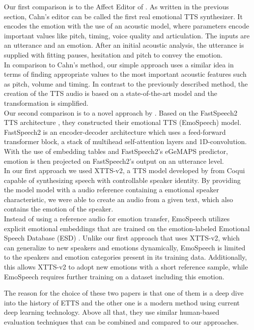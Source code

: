 \documentclass[11pt]{article}
\begin{document}
Our first comparison is to the Affect Editor of \cite{cahn_generation_2000}. As written in the previous section, Cahn's editor can be called the first real emotional TTS synthesizer. It encodes the emotion with the use of an acoustic model, where parameters encode important values like pitch, timing, voice quality and articulation. The inputs are an utterance and an emotion. After an initial acoustic analysis, the utterance is supplied with fitting pauses, hesitation and pitch to convey the emotion. \\
In comparison to Cahn's method, our simple approach uses a similar idea in terms of finding appropriate values to the most important acoustic features such as pitch, volume and timing. In contrast to the previously described method, the creation of the TTS audio is based on a state-of-the-art model and the transformation is simplified.\\
Our second comparison is to a novel approach by \cite{diatlova_emospeech_2023}. Based on the FastSpeech2 TTS architecture \cite{ren2020fastspeech}, they constructed their emotional TTS (EmoSpeech) model. FastSpeech2 is an encoder-decoder architecture which uses a feed-forward transformer block, a stack of multihead self-attention layers and 1D-convolution. With the use of embedding tables and FastSpeech2's eGeMAPS predictor, emotion is then projected on FastSpeech2's output on an utterance level. \\
In our first approach we used XTTS-v2, a TTS model developed by \cite{casanova2024xtts} from Coqui capable of synthesizing speech with controllable speaker identity. By providing the model model with a audio reference containing a emotional speaker characteristic, we were able to create an audio from a given text, which also contains the emotion of the speaker. \\
Instead of using a reference audio for emotion transfer, EmoSpeech utilizes explicit emotional embeddings that are trained on the emotion-labeled Emotional Speech Database (ESD) \cite{zhou2022emotional}. Unlike our first approach that uses XTTS-v2, which can generalize to new speakers and emotions dynamically, EmoSpeech is limited to the speakers and emotion categories present in its training data. Additionally, this allows XTTS-v2 to adopt new emotions with a short reference sample, while EmoSpeech requires further training on a dataset including this emotion.   

The reason for the choice of these two papers is that one of them is a deep dive into the history of ETTS and the other one is a modern method using current deep learning technology. Above all that, they use similar human-based evaluation techniques that can be combined and compared to our approaches.
\end{document}
